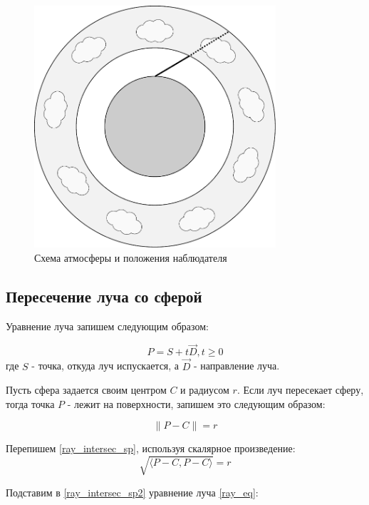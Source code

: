 \begin{figure}[h]
	\centering
	\includegraphics[width=0.8\textwidth]{assets/img/earth.pdf} %
	\caption{Схема атмосферы и положения наблюдателя}
	\label{fig:earth}
\end{figure}

\subsection{Пересечение луча со сферой}

Уравнение луча запишем следующим образом:

\begin{equation}
	\label{ray_eq}
	P = S + t \vec{D}, t \ge 0
\end{equation}
где $ S $ - точка, откуда луч испускается, а $ \vec{D} $ - направление луча.

Пусть сфера задается своим центром $ C $ и радиусом $ r $. Если луч пересекает сферу, тогда точка $ P $ - лежит на поверхности, запишем это следующим образом:

\begin{equation}
	\label{ray_intersec_sp}
	\| P - C \| = r
\end{equation}

Перепишем \eqref{ray_intersec_sp}, используя скалярное произведение:
\begin{equation}
	\label{ray_intersec_sp2}
	\sqrt{\langle P - C , P - C \rangle} = r
\end{equation}

Подставим в \eqref{ray_intersec_sp2} уравнение луча \eqref{ray_eq}:

